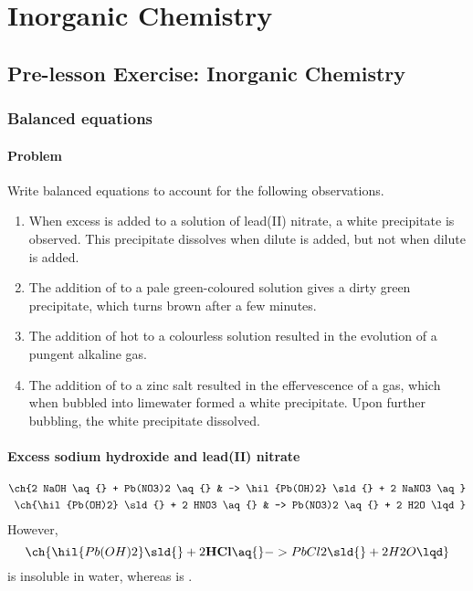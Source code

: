 \chapter{Inorganic Chemistry}
\section{Pre-lesson Exercise: Inorganic Chemistry}
\subsection{Balanced equations}
\subsubsection{Problem}
Write balanced equations to account for the following observations.
\begin{enumerate}
	\item When excess  is added to a solution of lead(II) nitrate, a
	      white precipitate is observed. This precipitate dissolves when dilute 
	      is added, but not when dilute  is added.
	\item The addition of  to a pale green-coloured solution gives a dirty
	      green precipitate, which turns brown after a few minutes.
	\item The addition of hot  to a colourless solution resulted in the
	      evolution of a pungent alkaline gas.
	\item The addition of  to a zinc salt resulted in the effervescence
	      of a gas, which when bubbled into limewater formed a white precipitate. Upon further
	      bubbling, the white precipitate dissolved.
\end{enumerate}

\subsubsection{Excess sodium hydroxide and lead(II) nitrate}
\begin{align*}
	\ch{2 NaOH \aq{} + Pb(NO3)2 \aq{}       & -> \hil{Pb(OH)2} \sld{} + 2 NaNO3 \aq} \\
	\ch{\hil{Pb(OH)2} \sld{} + 2 HNO3 \aq{} & -> Pb(NO3)2 \aq{} + 2 H2O \lqd}        \\
\end{align*}
However,
\begin{equation*}
	\ch{\hil{Pb(OH)2} \sld{} + 2 \bf{HCl} \aq{} -> PbCl2 \sld{} + 2 H2O \lqd}        \\
\end{equation*}
 is insoluble in water, whereas  is .

